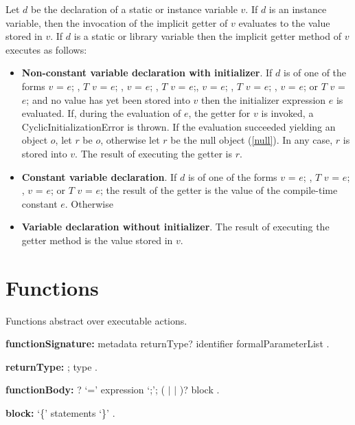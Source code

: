 \documentclass{article}
\newcommand{\code}[1]{{\sf #1}}
\begin{document}
\LMHash{}
Let $d$ be the declaration of a static or instance variable $v$.  If $d$ is an instance variable, then the invocation of the implicit getter  of $v$ evaluates to the value stored in $v$.
If $d$ is a static or library variable then the implicit getter method of $v$ executes as follows:
\begin{itemize}
\item {\bf Non-constant variable declaration with initializer}. If $d$ is of one of the forms \code{\VAR{} $v$ = $e$;} ,  \code{$T$ $v$ = $e$;} ,   \code{\FINAL{} $v$ = $e$;} ,  \code{\FINAL{} $T$ $v$ = $e$;}, \code{\STATIC{} $v$ = $e$; }, \code{\STATIC{} $T$ $v$ = $e$; }, \code{\STATIC{} \FINAL{} $v$ = $e$; } or \code{\STATIC{} \FINAL{} $T$ $v$ = $e$;} and no value has yet been stored into $v$ then the initializer expression $e$ is evaluated. If, during the evaluation of $e$, the getter for $v$ is invoked, a \code{CyclicInitializationError} is thrown. If the evaluation succeeded yielding an object $o$, let $r$ be $o$, otherwise let $r$ be the null object (\ref{null}). In any case, $r$ is stored into $v$. The result of executing the getter is $r$.
\item  {\bf Constant variable declaration}. If $d$ is of one of the forms \code{\CONST{} $v$ = $e$; } ,  \code{\CONST{} $T$  $v$ = $e$; },  \code{\STATIC{} \CONST{} $v$ = $e$; }  or \code{\STATIC{} \CONST{} $T$ $v$ = $e$;} the result of the getter is the value of the compile-time constant $e$. 
Otherwise
\item {\bf Variable declaration without initializer}. The result of executing the getter method is the value stored in $v$.
\end{itemize}





\section{Functions}

\LMHash{}
Functions abstract over executable actions.

\begin{grammar}
{\bf functionSignature:}
    metadata returnType? identifier formalParameterList
    .

{\bf returnType:}
      \VOID{};
      type
    .

{\bf functionBody:} \ASYNC{}?  `={\escapegrammar \gt}' expression `{\escapegrammar ;}';
     (\ASYNC{} $|$ \ASYNC* $|$ \SYNC*)? block
    .

{\bf block:}
      `\{' statements `\}'
    .

\end{grammar}
\end{document}
